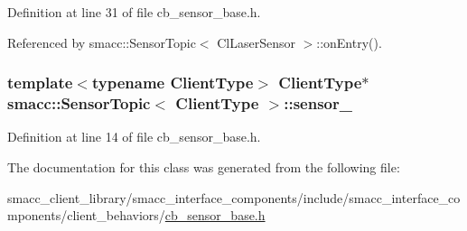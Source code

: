 Definition at line 31 of file cb\+\_\+sensor\+\_\+base.\+h.



Referenced by smacc\+::\+Sensor\+Topic$<$ Cl\+Laser\+Sensor $>$\+::on\+Entry().

\subsubsection[{\texorpdfstring{sensor\+\_\+}{sensor_}}]{\setlength{\rightskip}{0pt plus 5cm}template$<$typename Client\+Type$>$ Client\+Type$\ast$ {\bf smacc\+::\+Sensor\+Topic}$<$ Client\+Type $>$\+::sensor\+\_\+}\hypertarget{classsmacc_1_1SensorTopic_affbf010b80f779369dd14d786c1ed9e3}{}\label{classsmacc_1_1SensorTopic_affbf010b80f779369dd14d786c1ed9e3}


Definition at line 14 of file cb\+\_\+sensor\+\_\+base.\+h.



The documentation for this class was generated from the following file\+:\begin{DoxyCompactItemize}
\item 
smacc\+\_\+client\+\_\+library/smacc\+\_\+interface\+\_\+components/include/smacc\+\_\+interface\+\_\+components/client\+\_\+behaviors/\hyperlink{cb__sensor__base_8h}{cb\+\_\+sensor\+\_\+base.\+h}\end{DoxyCompactItemize}
